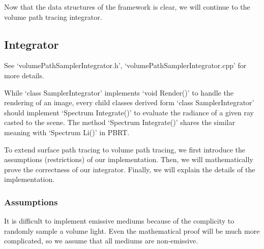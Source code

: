 \documentclass[acmtog]{acmart}
\begin{document}
Now that the data structures of the framework is clear, we will continue to the volume path tracing integrator.

\subsection{Integrator}
See `volumePathSamplerIntegrator.h', `volumePathSamplerIntegrator.cpp' for more details.\par
While `class SamplerIntegrator' implements `void Render()' to handle the rendering of an image, 
every child classes derived form `class SamplerIntegrator' should implement `Spectrum Integrate()' to evaluate the radiance of a given ray casted to the scene.
The method `Spectrum Integrate()' shares the similar meaning with `Spectrum Li()' in PBRT.\par
To extend surface path tracing to volume path tracing, we first introduce the assumptions (restrictions) of our implementation.
Then, we will mathematically prove the correctness of our integrator.
Finally, we will explain the details of the implementation.
\subsubsection{Assumptions}
It is difficult to implement emissive mediums because of the complicity to randomly sample a volume light.
Even the mathematical proof will be much more complicated, 
so we assume that all mediums are non-emissive.
\end{document}

